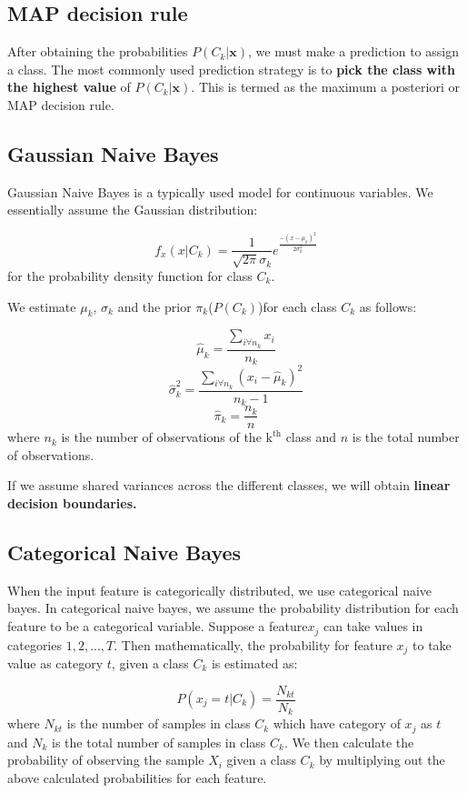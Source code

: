 \documentclass[conference]{IEEEtran}
\begin{document}
\subsection{MAP decision rule}

After obtaining the probabilities $P(C_k|\mathbf{x})$, we must make a prediction to assign a class. The most commonly used prediction strategy is to \textbf{pick the class with the highest value} of $P(C_k|\mathbf{x})$. This is termed as the  maximum a posteriori or MAP decision rule.

\subsection{Gaussian Naive Bayes}

Gaussian Naive Bayes is a typically used model for continuous variables. We essentially assume the Gaussian distribution:

$$ f_x(x|C_k) = \frac{1}{\sqrt{2\pi}{\sigma}_k}e^{\frac{-(x-{\mu}_k)^2}{2{\sigma}^2_k}} $$ for the probability density function for class $C_k$. 

We estimate ${\mu}_k$, ${\sigma}_k$ and the prior ${\pi}_k$($P(C_k)$)for each class $C_k$ as follows:

$$ \hat{\mu}_k = \frac{\sum_{i \forall n_k}x_i}{n_k} $$
$$ \hat{\sigma}_k^2 = \frac{\sum_{i \forall n_k}(x_i - \hat{\mu}_k)^2}{n_k - 1} $$
$$ \hat{\pi}_k = \frac{n_k}{n} $$ where $n_k$ is the number of observations of the $\textrm{k}^\textrm{th}$ class and $n$ is the total number of observations. 

If we assume shared variances across the different classes, we will obtain \textbf{linear decision boundaries.}

\subsection{Categorical Naive Bayes}

When the input feature is categorically distributed, we use categorical naive bayes. In categorical naive bayes, we assume the probability distribution for each feature to be a categorical variable. Suppose a feature$x_j$ can take values in categories ${1, 2, ..., T}$. Then mathematically, the probability for feature $x_j$ to take value as category $t$, given a class $C_k$ is estimated as:

$$ P(x_j=t|C_k) =  \frac{N_{kt}}{N_k}$$ where $N_{kt}$ is the number of samples in class $C_k$ which have category of $x_j$ as $t$ and $N_k$ is the total number of samples in class $C_k$. We then calculate the probability of observing the sample $X_i$ given a class $C_k$ by multiplying out the above calculated probabilities for each feature.
\end{document}
